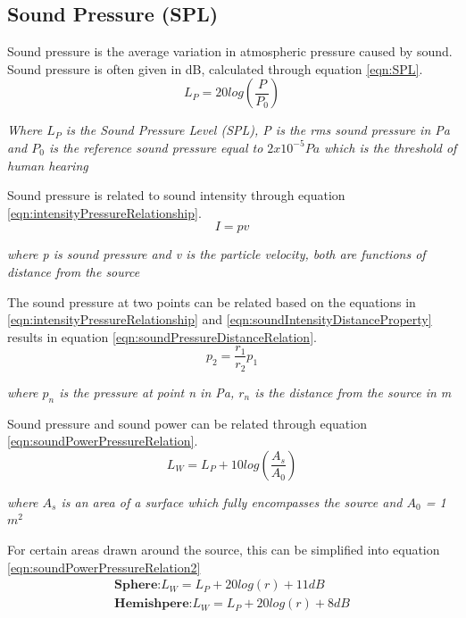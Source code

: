 \documentclass[12pt, a4paper]{article}
\begin{document}
	\subsection{Sound Pressure (SPL)}
	Sound pressure is the average variation in atmospheric pressure caused by sound. Sound pressure is often given in dB, calculated through equation \ref{eqn:SPL}. \cite{soundPressure}
	\begin{equation}
		\label{eqn:SPL}
		L_P = 20log\left(\frac{P}{P_0}\right)
	\end{equation}
	\begin{center}
		\textit{Where $L_P$ is the Sound Pressure Level (SPL), P is the rms sound pressure in Pa and $P_0$ is the reference sound pressure equal to $2x10^{-5}Pa$ which is the threshold of human hearing}
	\end{center}
	Sound pressure is related to sound intensity through equation \ref{eqn:intensityPressureRelationship}.
	\begin{equation}
		\label{eqn:intensityPressureRelationship}
		I = pv
	\end{equation}
	\begin{center}
		\textit{where p is sound pressure and v is the particle velocity, both are functions of distance from the source}
	\end{center}
	The sound pressure at two points can be related based on the equations in \ref{eqn:intensityPressureRelationship} and \ref{eqn:soundIntensityDistanceProperty} results in equation \ref{eqn:soundPressureDistanceRelation}. 
	\begin{equation}
		\label{eqn:soundPressureDistanceRelation}
		p_2 = \frac{r_1}{r_2}p_1
	\end{equation}
	\begin{center}
		\textit{where $p_n$ is the pressure at point n in Pa, $r_n$ is the distance from the source in m}
	\end{center}
	Sound pressure and sound power can be related through equation \ref{eqn:soundPowerPressureRelation}. \cite{soundPowerCalculator}
	\begin{equation}
		\label{eqn:soundPowerPressureRelation}
		L_W = L_P + 10log\left(\frac{A_s}{A_0}\right)
	\end{equation}
	\begin{center}
		\textit{where $A_s$ is an area of a surface which fully encompasses the source and $A_0$ = 1$m^2$}
	\end{center}
	For certain areas drawn around the source, this can be simplified into equation \ref{eqn:soundPowerPressureRelation2} \cite{soundPower}
	\begin{equation}
		\label{eqn:soundPowerPressureRelation2}
		\begin{aligned}
			\textbf{Sphere:}		L_W = L_P + 20log(r) + 11 dB \\
			\textbf{Hemishpere:}    L_W = L_P + 20log(r) + 8dB 
		\end{aligned}
	\end{equation}
	\pagebreak
\end{document}
